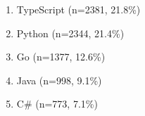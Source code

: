 \begin{enumerate}
  \item TypeScript (n=2381, 21.8\%)
  \item Python (n=2344, 21.4\%)
  \item Go (n=1377, 12.6\%)
  \item Java (n=998, 9.1\%)
  \item C\# (n=773, 7.1\%)
\end{enumerate}
